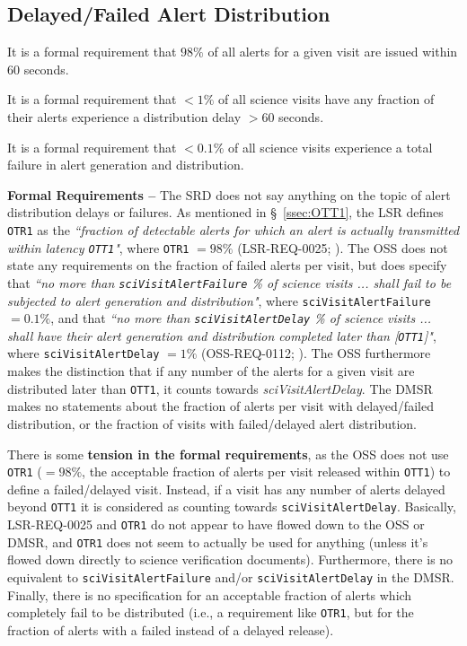 \documentclass[DM,authoryear,toc]{lsstdoc}
\begin{document}
\subsection{Delayed/Failed Alert Distribution}\label{ssec:OTR1}

It is a formal requirement that $98\%$ of all alerts for a given visit are issued within $60$ seconds.

It is a formal requirement that $<1\%$ of all science visits have any fraction of their alerts experience a distribution delay $>60$ seconds.

It is a formal requirement that $<0.1\%$ of all science visits experience a total failure in alert generation and distribution.

{\bf Formal Requirements --} The SRD does not say anything on the topic of alert distribution delays or failures. As mentioned in \S~\ref{ssec:OTT1}, the LSR defines {\tt OTR1} as the {\it ``fraction of detectable alerts for which an alert is actually transmitted within latency {\tt OTT1}"}, where {\tt OTR1} $=98\%$ (LSR-REQ-0025; ). The OSS does not state any requirements on the fraction of failed alerts per visit, but does specify that {\it ``no more than {\tt sciVisitAlertFailure} \% of science visits ... shall fail to be subjected to alert generation and distribution"}, where {\tt sciVisitAlertFailure} $=0.1\%$, and that {\it ``no more than {\tt sciVisitAlertDelay} \% of science visits ... shall have their alert generation and distribution completed later than [{\tt OTT1}]"}, where {\tt sciVisitAlertDelay} $=1\%$ (OSS-REQ-0112; ). The OSS furthermore makes the distinction that if any number of the alerts for a given visit are distributed later than {\tt OTT1}, it counts towards {\it sciVisitAlertDelay}. The DMSR makes no statements about the fraction of alerts per visit with delayed/failed distribution, or the fraction of visits with failed/delayed alert distribution.

There is some {\bf tension in the formal requirements}, as the OSS does not use {\tt OTR1} ($=98\%$, the acceptable fraction of alerts per visit released within {\tt OTT1}) to define a failed/delayed visit. Instead, if a visit has any number of alerts delayed beyond {\tt OTT1} it is considered as counting towards {\tt sciVisitAlertDelay}. Basically, LSR-REQ-0025 and {\tt OTR1} do not appear to have flowed down to the OSS or DMSR, and {\tt OTR1} does not seem to actually be used for anything (unless it's flowed down directly to science verification documents). Furthermore, there is no equivalent to {\tt sciVisitAlertFailure} and/or {\tt sciVisitAlertDelay} in the DMSR. Finally, there is no specification for an acceptable fraction of alerts which completely fail to be distributed (i.e., a requirement like {\tt OTR1}, but for the fraction of alerts with a failed instead of a delayed release).
\end{document}

